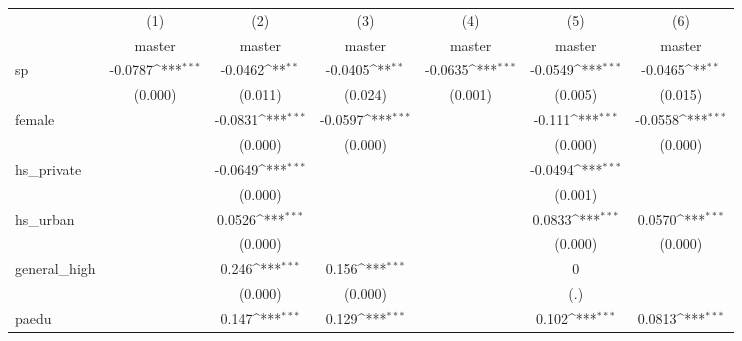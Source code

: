 {
\def\sym#1{\ifmmode^{#1}\else\(^{#1}\)\fi}
\begin{tabular}{l*{6}{c}}
\hline\hline
            &\multicolumn{1}{c}{(1)}&\multicolumn{1}{c}{(2)}&\multicolumn{1}{c}{(3)}&\multicolumn{1}{c}{(4)}&\multicolumn{1}{c}{(5)}&\multicolumn{1}{c}{(6)}\\
            &\multicolumn{1}{c}{master}&\multicolumn{1}{c}{master}&\multicolumn{1}{c}{master}&\multicolumn{1}{c}{master}&\multicolumn{1}{c}{master}&\multicolumn{1}{c}{master}\\
\hline
sp          &     -0.0787\sym{***}&     -0.0462\sym{**} &     -0.0405\sym{**} &     -0.0635\sym{***}&     -0.0549\sym{***}&     -0.0465\sym{**} \\
            &     (0.000)         &     (0.011)         &     (0.024)         &     (0.001)         &     (0.005)         &     (0.015)         \\
[1em]
female      &                     &     -0.0831\sym{***}&     -0.0597\sym{***}&                     &      -0.111\sym{***}&     -0.0558\sym{***}\\
            &                     &     (0.000)         &     (0.000)         &                     &     (0.000)         &     (0.000)         \\
[1em]
hs\_private  &                     &     -0.0649\sym{***}&                     &                     &     -0.0494\sym{***}&                     \\
            &                     &     (0.000)         &                     &                     &     (0.001)         &                     \\
[1em]
hs\_urban    &                     &      0.0526\sym{***}&                     &                     &      0.0833\sym{***}&      0.0570\sym{***}\\
            &                     &     (0.000)         &                     &                     &     (0.000)         &     (0.000)         \\
[1em]
general\_high&                     &       0.246\sym{***}&       0.156\sym{***}&                     &           0         &                     \\
            &                     &     (0.000)         &     (0.000)         &                     &         (.)         &                     \\
[1em]
paedu       &                     &       0.147\sym{***}&       0.129\sym{***}&                     &       0.102\sym{***}&      0.0813\sym{***}\\

\end{tabular}}
